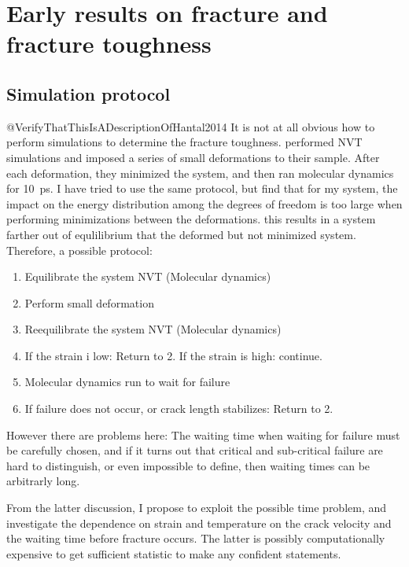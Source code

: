 \section{Early results on fracture and fracture toughness}



\subsection{Simulation protocol}
@VerifyThatThisIsADescriptionOfHantal2014
It is not at all obvious how to perform simulations to determine the fracture toughness. \citet{Hantal2014} performed NVT simulations and imposed a series of small deformations to their sample. After each deformation, they minimized the system, and then ran molecular dynamics for \SI{10}{\pico\second}. I have tried to use the same protocol, but find that for my system, the impact on the energy distribution among the degrees of freedom is too large when performing minimizations between the deformations. this results in a system farther out of equlilibrium that the deformed but not minimized system. Therefore, a possible protocol:

\begin{enumerate}
\item Equilibrate the system NVT (Molecular dynamics)
\item Perform small deformation
\item Reequilibrate the system NVT (Molecular dynamics)
\item If the strain i low: Return to 2. If the strain is high: continue.
\item Molecular dynamics run to wait for failure
\item If failure does not occur, or crack length stabilizes: Return to 2. 
\end{enumerate}

However there are problems here: The waiting time when waiting for failure must be carefully chosen, and if it turns out that critical and sub-critical failure are hard to distinguish, or even impossible to define, then waiting times can be arbitrarly long. 

From the latter discussion, I propose to exploit the possible time problem, and investigate the dependence on strain and temperature on the crack velocity and the waiting time before fracture occurs. The latter is possibly computationally expensive to get sufficient statistic to make any confident statements. 

